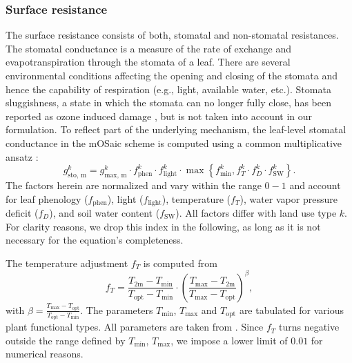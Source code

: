 \documentclass[gmd, manuscript]{copernicus}
\begin{document}
\subsubsection{Surface resistance}
\label{subsubsec:Rc}
The surface resistance consists of both, stomatal and non-stomatal resistances.\\ 
The stomatal conductance is a measure of the rate of  exchange and evapotranspiration through the stomata of a leaf. There are several environmental conditions affecting the opening and closing of the stomata and hence the capability of respiration (e.g., light, available water, etc.). Stomata sluggishness, a state in which the stomata can no longer fully close, has been reported as ozone induced damage \citep{SR:Hoshika2015}, but is not taken into account in our formulation. To reflect part of the underlying mechanism, the leaf-level stomatal conductance in the mOSaic scheme is computed using a common multiplicative ansatz \citep{BallBerry1987, ICP:MappingManual2017}:
%
\begin{equation}
  g^k_\text{sto, m} = g^k_\text{max, m} \cdot f^k_\text{phen} \cdot f^k_\text{light} \cdot \max{\left\{f^k_\text{min}, f^k_T \cdot f^k_D \cdot f^k_\text{SW}\right\}}.
  \label{eq:stomatal}
\end{equation}
%
The factors herein are normalized and vary within the range $0-1$ and account for leaf phenology ($f_\text{phen}$), light ($f_\text{light}$), temperature ($f_T$), water vapor pressure deficit ($f_D$), and soil water content ($f_\text{SW}$). All factors differ with land use type $k$. For clarity reasons, we drop this index in the following, as long as it is not necessary for the equation's completeness.

The temperature adjustment $f_T$ is computed from
%
\begin{equation}
  f_T = \frac{T_\text{2m}-T_\text{min}}{T_\text{opt}-T_\text{min}} \cdot \left(\frac{T_{\text{max}}-T_\text{2m}}{T_{\text{max}}-T_\text{opt}}\right)^\beta, 
\end{equation}
with $\beta = \frac{T_\text{max}-T_\text{opt}}{T_\text{opt}-T_\text{min}}$. The parameters $T_\text{min}$, $T_\text{max}$ and $T_\text{opt}$ are tabulated for various plant functional types. All parameters are taken from \citet[][Tables S16, S19]{ACP:Simpson2012}. Since $f_T$ turns negative outside the range defined by $T_\text{min}$, $T_\text{max}$, we impose a lower limit of $0.01$ for numerical reasons.
\end{document}
